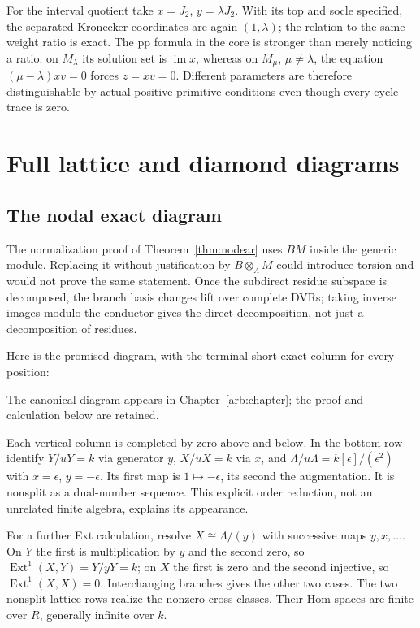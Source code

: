 \documentclass[11pt,oneside,openany]{book}
\theoremstyle{definition}\newtheorem{definition}[theorem]{Definition}
\theoremstyle{remark}\newtheorem{remark}[theorem]{Remark}
\begin{document}
For the interval quotient take $x=J_2$, $y=\lambda J_2$. With its top and socle specified, the separated Kronecker coordinates are again $(1,\lambda)$; the relation to the same-weight ratio is exact. The pp formula in the core is stronger than merely noticing a ratio: on $M_\lambda$ its solution set is $\operatorname{im}x$, whereas on $M_\mu$, $\mu\ne\lambda$, the equation $(\mu-\lambda)xv=0$ forces $z=xv=0$. Different parameters are therefore distinguishable by actual positive-primitive conditions even though every cycle trace is zero.


\chapter{Full lattice and diamond diagrams}
\section{The nodal exact diagram}
The normalization proof of Theorem~\ref{thm:nodear} uses $BM$ inside the generic module. Replacing it without justification by $B\otimes_\Lambda M$ could introduce torsion and would not prove the same statement. Once the subdirect residue subspace is decomposed, the branch basis changes lift over complete DVRs; taking inverse images modulo the conductor gives the direct decomposition, not just a decomposition of residues.

Here is the promised diagram, with the terminal short exact column for every position:
\par\noindent The canonical diagram appears in Chapter~\ref{arb:chapter}; the proof and calculation below are retained.\par
Each vertical column is completed by zero above and below. In the bottom row identify $Y/uY=k$ via generator $y$, $X/uX=k$ via $x$, and $\Lambda/u\Lambda=k[\epsilon]/(\epsilon^2)$ with $x=\epsilon$, $y=-\epsilon$. Its first map is $1\mapsto-\epsilon$, its second the augmentation. It is nonsplit as a dual-number sequence. This explicit order reduction, not an unrelated finite algebra, explains its appearance.

For a further Ext calculation, resolve $X\cong\Lambda/(y)$ with successive maps $y,x,\ldots$. On $Y$ the first is multiplication by $y$ and the second zero, so $\operatorname{Ext}^1(X,Y)=Y/yY=k$; on $X$ the first is zero and the second injective, so $\operatorname{Ext}^1(X,X)=0$. Interchanging branches gives the other two cases. The two nonsplit lattice rows realize the nonzero cross classes. Their Hom spaces are finite over $R$, generally infinite over $k$.
\end{document}
